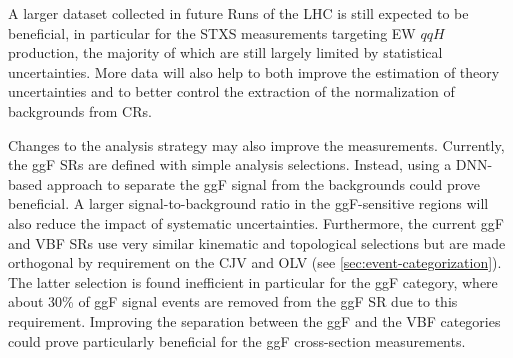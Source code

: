 A larger dataset collected in future Runs of the LHC is still expected to be beneficial, in particular for the STXS measurements targeting EW $qqH$ production, the majority of which are still largely limited by statistical uncertainties. 
More data will also help to both improve the estimation of theory uncertainties and to better control the extraction of the normalization of backgrounds from CRs. 

Changes to the analysis strategy may also improve the measurements. 
Currently, the ggF SRs are defined with simple analysis selections. Instead, using a DNN-based approach to separate the ggF signal from the backgrounds could prove beneficial. 
A larger signal-to-background ratio in the ggF-sensitive regions will also reduce the impact of systematic uncertainties. 
Furthermore, the current ggF and VBF \TwoJet SRs use very similar kinematic and topological selections but are made orthogonal by requirement on the CJV and OLV (see \cref{sec:event-categorization}). The latter selection is found inefficient in particular for the ggF \TwoJet category, where about 30\% of ggF signal events are removed from the ggF SR due to this requirement. Improving the separation between the ggF \TwoJet and the VBF \TwoJet categories could prove particularly beneficial for the ggF \TwoJet cross-section measurements. 

